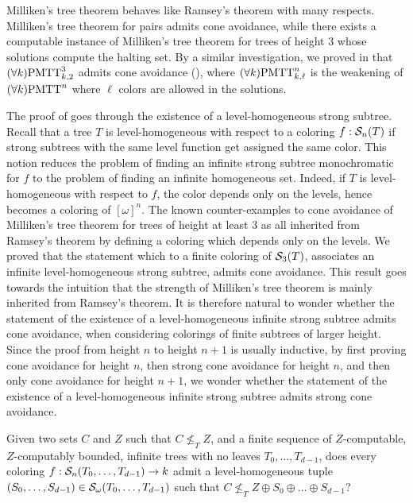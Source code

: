 Milliken's tree theorem behaves like Ramsey's theorem with many respects. Milliken's tree theorem for pairs admits cone avoidance, while there exists a computable instance of Milliken's tree theorem for trees of height 3 whose solutions compute the halting set. By a similar investigation, we proved in  that $(\forall k)\mathrm{PMTT}^{3}_{k,2}$ admits cone avoidance (), where $(\forall k)\mathrm{PMTT}^{n}_{k,\ell}$ is the weakening of $(\forall k)\mathrm{PMTT}^{n}_{}$ where $\ell$ colors are allowed in the solutions.

The proof of  goes through the existence of a level-homogeneous strong subtree. Recall that a tree $T$ is level-homogeneous with respect to a coloring $f: \mathcal{S}_{n}({T})$ if strong subtrees with the same level function get assigned the same color. This notion reduces the problem of finding an infinite strong subtree monochromatic for $f$ to the problem of finding an infinite homogeneous set. Indeed, if $T$ is level-homogeneous with respect to $f$, the color depends only on the levels, hence becomes a coloring of $[\omega]^n$. The known counter-examples to cone avoidance of Milliken's tree theorem for trees of height at least 3 as all inherited from Ramsey's theorem by defining a coloring which depends only on the levels. We proved that the statement which to a finite coloring of $\mathcal{S}_{3}({T})$, associates an infinite level-homogeneous strong subtree, admits cone avoidance. This result goes towards the intuition that the strength of Milliken's tree theorem is mainly inherited from Ramsey's theorem. It is therefore natural to wonder whether the statement of the existence of a level-homogeneous infinite strong subtree admits cone avoidance, when considering colorings of finite subtrees of larger height. Since the proof from height $n$ to height $n+1$ is usually inductive, by first proving cone avoidance for height $n$, then strong cone avoidance for height $n$, and then only cone avoidance for height $n+1$, we wonder whether the statement of the existence of a level-homogeneous infinite strong subtree admits strong cone avoidance.

\begin{question}
Given two sets $C$ and $Z$ such that $C \not \leq_T Z$, and a finite sequence of $Z$-computable, $Z$-computably bounded, infinite trees with no leaves $T_0, \dots, T_{d-1}$, does every coloring $f: \mathcal{S}_{n}({T_0, \dots, T_{d-1}}) \to k$ admit a level-homogeneous tuple $(S_0, \dots, S_{d-1}) \in \mathcal{S}_{\omega}({T_0, \dots, T_{d-1}})$ such that $C \not \leq_T Z \oplus S_0 \oplus \dots \oplus S_{d-1}$?
\end{question}

